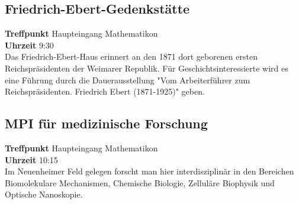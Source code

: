 \subsection*{Friedrich-Ebert-Gedenkstätte}
\textbf{Treffpunkt} Haupteingang Mathematikon\\
\textbf{Uhrzeit} 9:30\\
Das Friedrich-Ebert-Haus erinnert an den 1871 dort geborenen ersten Reichspräsidenten der Weimarer Republik. Für Geschichtsinteressierte wird es eine Führung durch die Dauerausstellung "Vom Arbeiterführer zum Reichspräsidenten. Friedrich Ebert (1871-1925)" geben.

\subsection*{MPI für medizinische Forschung}
\textbf{Treffpunkt} Haupteingang Mathematikon\\
\textbf{Uhrzeit} 10:15\\
Im Neuenheimer Feld gelegen forscht man hier interdisziplinär in den Bereichen Biomolekulare Mechanismen, Chemische Biologie, Zelluläre Biophysik und Optische Nanoskopie. 